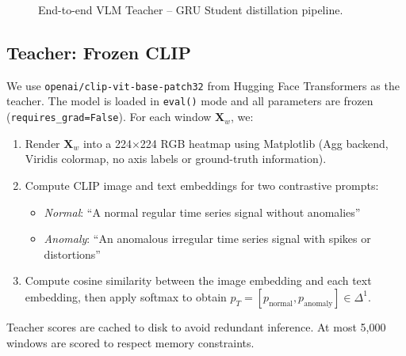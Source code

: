 \documentclass[10pt,twocolumn]{article}
\begin{document}
\begin{figure}[H]
\centering
{}
\caption{End-to-end VLM Teacher -- GRU Student distillation pipeline.}
\label{fig:arch}
\end{figure}

\subsection{Teacher: Frozen CLIP}

We use \texttt{openai/clip-vit-base-patch32} from Hugging Face Transformers as the teacher. The model is loaded in \texttt{eval()} mode and all parameters are frozen (\texttt{requires\_grad=False}). For each window $\mathbf{X}_w$, we:
\begin{enumerate}[leftmargin=*, topsep=2pt, itemsep=1pt]
    \item Render $\mathbf{X}_w$ into a 224$\times$224 RGB heatmap using Matplotlib (Agg backend, Viridis colormap, no axis labels or ground-truth information).
    \item Compute CLIP image and text embeddings for two contrastive prompts:
    \begin{itemize}
        \item \textit{Normal}: ``A normal regular time series signal without anomalies''
        \item \textit{Anomaly}: ``An anomalous irregular time series signal with spikes or distortions''
    \end{itemize}
    \item Compute cosine similarity between the image embedding and each text embedding, then apply softmax to obtain $p_T = [p_{\text{normal}}, p_{\text{anomaly}}] \in \Delta^1$.
\end{enumerate}
Teacher scores are cached to disk to avoid redundant inference. At most 5{,}000 windows are scored to respect memory constraints.
\end{document}
